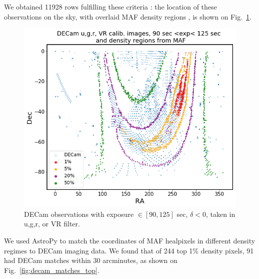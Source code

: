 \documentclass[DM,lsstdraft,toc,usenatbib]{lsstdoc}
\begin{document}
We obtained 11928 rows fulfilling these criteria : the location of these observations on the sky, with overlaid MAF density regions , is shown on Fig.~\ref{fig:decam_regions}. 

 
\begin{figure}
\includegraphics[width=1.0\columnwidth]{figs/Illustrate_density_regions_DECam.png}
\caption{DECam observations with exposure $\in [90,125] $ sec, $\delta < 0$, taken in  u,g,r, or VR filter.  }
\label{fig:decam_regions}
\end{figure} 

We used AstroPy to match the coordinates of MAF healpixels in different density regimes to DECam imaging data. We found that of 244 top 1\% density pixels, 91 had DECam matches within 30 arcminutes, as shown on Fig.~\ref{fig:decam_matches_top}. 
\end{document}
